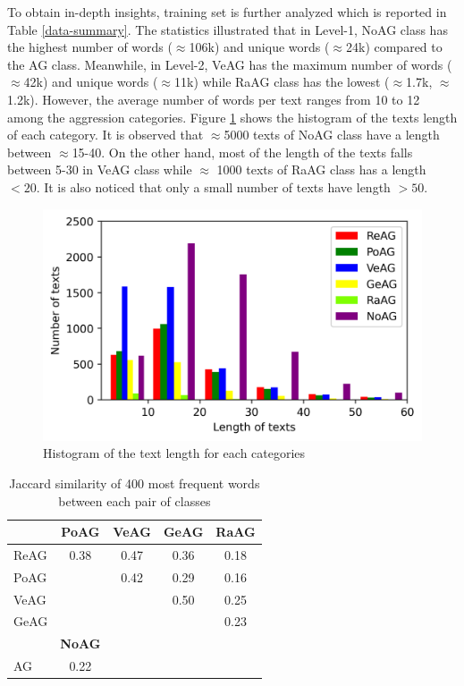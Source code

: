 \documentclass[11pt]{article}
\begin{document}
To obtain in-depth insights, training set is further analyzed which is reported in Table \ref{data-summary}. The statistics illustrated that in Level-1, NoAG class has the highest number of words ($\approx$106k) and unique words ($\approx$24k) compared to the AG class. Meanwhile, in Level-2, VeAG has the maximum number of words ($\approx$42k) and unique words ($\approx$11k) while RaAG class has the lowest ($\approx$1.7k, $\approx$1.2k). However, the average number of words per text ranges from 10 to 12 among the aggression categories. Figure \ref{hist} shows the histogram of the texts length of each category. It is observed that $\approx$5000 texts of NoAG class have a length between $\approx$15-40. On the other hand, most of the length of the texts falls between 5-30 in VeAG class while $\approx$ 1000 texts of RaAG class has a length $<20$. It is also noticed that only a small number of texts have length $>50$. 
\begin{figure}[h!]
\centering
\includegraphics[width =\linewidth]{Figure/dist.png}
\caption{Histogram of the text length for each categories} 
\label{hist}
\end{figure}

\begin{table}[h!]

\begin{center}
\small
\begin{tabular}{lcccc}
\hline
  & \textbf{PoAG}  & \textbf{VeAG} & \textbf{GeAG} & \textbf{RaAG}  \\
\hline
ReAG   & 0.38  &  0.47 & 0.36 & 0.18 \\
PoAG   &  & 0.42 & 0.29 & 0.16  \\
VeAG   &  & & 0.50 & 0.25   \\
GeAG   &  & & & 0.23  \\
\hline
& \textbf{NoAG}& & &  \\
\hline
AG  &0.22 & & & \\

 \hline 
\end{tabular}
\caption{Jaccard similarity of 400 most frequent words between each pair of classes}
\label{jaccard}
\end{center}
\end{table}
\end{document}
